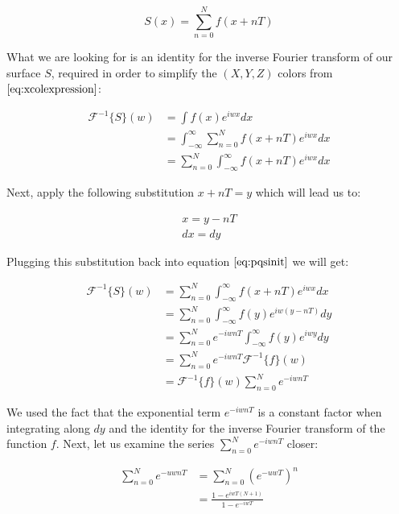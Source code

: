 \begin{equation}
  S(x) = \sum_{n=0}^N f(x+nT)
\label{eq:replicatedpatchsurface}
\end{equation}

What we are looking for is an identity for the inverse Fourier transform of our surface $S$, required in order to simplify the $(X,Y,Z)$ colors from $\ref{eq:xcolexpression}$:

\begin{align}
\mathcal{F}^{-1}\{S\}(w)
& =\int f(x) e^{iwx}dx \nonumber \\
& =\int_{-\infty}^{\infty} \sum_{n=0}^{N} f(x+nT) e^{iwx}dx \nonumber \\
& =\sum_{n=0}^{N} \int_{-\infty}^{\infty} f(x+nT) e^{iwx}dx
\label{eq:pqsinit}
\end{align}

Next, apply the following substitution $x+nT = y$ which will lead us to:

\begin{gather}
x=y-nT \nonumber \\
dx=dy
\label{eq:substitude1dpq}
\end{gather} 

Plugging this substitution back into equation $\ref{eq:pqsinit}$ we will get: 

\begin{align}
\mathcal{F}^{-1}\{S\}(w)
& =\sum_{n=0}^{N} \int_{-\infty}^{\infty} f(x+nT) e^{iwx}dx \nonumber \\
& =\sum_{n=0}^{N} \int_{-\infty}^{\infty} f(y) e^{iw(y-nT)}dy \nonumber \\
& =\sum_{n=0}^{N} e^{-iwnT} \int_{-\infty}^{\infty} f(y) e^{iwy}dy \nonumber \\
& =\sum_{n=0}^{N} e^{-iwnT} \mathcal{F}^{-1}\{f\}(w) \nonumber \\
& =\mathcal{F}^{-1}\{f\}(w) \sum_{n=0}^{N} e^{-iwnT}
\label{eq:pqsub}  
\end{align}

We used the fact that the exponential term $e^{-iwnT}$ is a constant factor when integrating along $dy$ and the identity for the inverse Fourier transform of the function $f$. Next, let us examine the series $\sum_{n=0}^N e^{-iwnT}$ closer:

\begin{align}
\sum_{n=0}^N e^{-uwnT}
& =\sum_{n=0}^N (e^{-uwT})^n \nonumber \\
& =\frac{1-e^{iwT(N+1)}}{1-e^{-iwT}}
\label{eq:pqgeometricseries}
\end{align}

